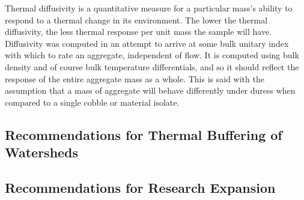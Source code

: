 Thermal diffusivity is a quantitative measure for a particular mass's ability to respond to a thermal change in its environment. The lower the thermal diffusivity, the less thermal response per unit mass the sample will have. Diffusivity was computed in an attempt to arrive at some bulk unitary index with which to rate an aggregate, independent of flow. It is computed using bulk density and of course bulk temperature differentials, and so it should reflect the response of the entire aggregate mass as a whole. This is said with the assumption that a mass of aggregate will behave differently under duress when compared to a single cobble or material isolate.

\subsection{Recommendations for Thermal Buffering of Watersheds}




\subsection{Recommendations for Research Expansion}




